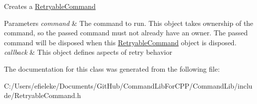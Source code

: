 Creates a \mbox{\hyperlink{class_command_lib_1_1_retryable_command}{Retryable\+Command}} 


\begin{DoxyParams}{Parameters}
{\em command} & The command to run. This object takes ownership of the command, so the passed command must not already have an owner. The passed command will be disposed when this \mbox{\hyperlink{class_command_lib_1_1_retryable_command}{Retryable\+Command}} object is disposed. \\
\hline
{\em callback} & This object defines aspects of retry behavior\\
\hline
\end{DoxyParams}


The documentation for this class was generated from the following file\+:\begin{DoxyCompactItemize}
\item 
C\+:/\+Users/efieleke/\+Documents/\+Git\+Hub/\+Command\+Lib\+For\+C\+P\+P/\+Command\+Lib/include/Retryable\+Command.\+h\end{DoxyCompactItemize}
